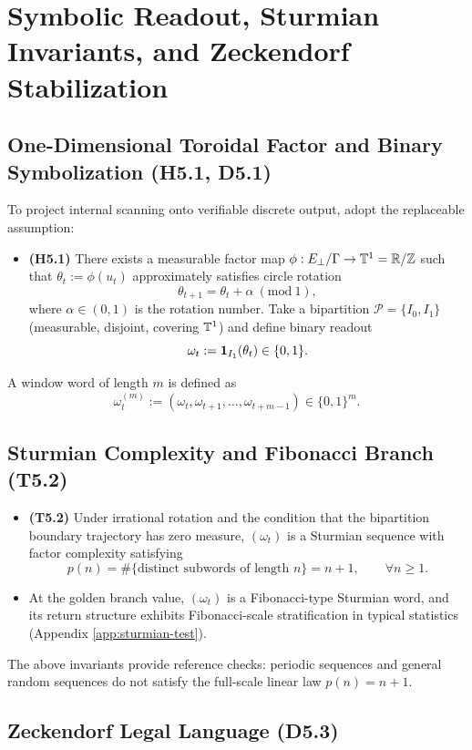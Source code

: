 \section{Symbolic Readout, Sturmian Invariants, and Zeckendorf Stabilization}\label{sec:symbolic}

\subsection{One-Dimensional Toroidal Factor and Binary Symbolization (H5.1, D5.1)}

To project internal scanning onto verifiable discrete output, adopt the replaceable assumption:
\begin{itemize}
  \item \textbf{(H5.1)} There exists a measurable factor map $\phi:E_{\perp}/\Gamma\to \mathbb{T}^{1}=\mathbb{R}/\mathbb{Z}$ such that $\theta_t:=\phi(u_t)$ approximately satisfies circle rotation
  \[
  \theta_{t+1}=\theta_t+\alpha\ (\mathrm{mod}\ 1),
  \]
  where $\alpha\in(0,1)$ is the rotation number. Take a bipartition $\mathcal{P}=\{I_0,I_1\}$ (measurable, disjoint, covering $\mathbb{T}^1$) and define binary readout
  \[
  \omega_t:=\mathbf{1}_{I_1}(\theta_t)\in\{0,1\}.
  \]
\end{itemize}
A window word of length $m$ is defined as
\[
\omega^{(m)}_t:=(\omega_t,\omega_{t+1},\dots,\omega_{t+m-1})\in\{0,1\}^{m}.
\]

\subsection{Sturmian Complexity and Fibonacci Branch (T5.2)}

\begin{itemize}
  \item \textbf{(T5.2)} Under irrational rotation and the condition that the bipartition boundary trajectory has zero measure, $(\omega_t)$ is a Sturmian sequence with factor complexity satisfying
  \[
  p(n)=\#\{\text{distinct subwords of length }n\}=n+1,\qquad \forall n\ge 1.
  \]
  \item At the golden branch value, $(\omega_t)$ is a Fibonacci-type Sturmian word, and its return structure exhibits Fibonacci-scale stratification in typical statistics (Appendix \ref{app:sturmian-test}).
\end{itemize}
The above invariants provide reference checks: periodic sequences and general random sequences do not satisfy the full-scale linear law $p(n)=n+1$.

\subsection{Zeckendorf Legal Language (D5.3)}

